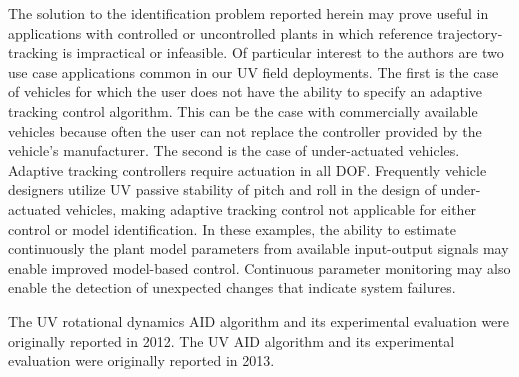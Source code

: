 The solution to the identification problem reported herein may prove
useful in applications with controlled or uncontrolled plants in which
reference trajectory-tracking is impractical or infeasible.
%
Of particular interest to the authors are two use case applications
common in our \ac{UV} field deployments.
%
The first is the case of vehicles for which the user does not have the
ability to specify an adaptive tracking control algorithm.
% 
This can be the case with commercially available vehicles because
often the user can not replace the controller provided by the
vehicle's manufacturer.
%
The second is the case of under-actuated vehicles.  
%
Adaptive tracking controllers require actuation in all \ac{DOF}.
%
Frequently vehicle designers utilize \ac{UV} passive stability of pitch
and roll in the design of under-actuated vehicles,
making adaptive tracking control not applicable for either control
or model identification.
%
In these examples, the ability to estimate continuously the plant
model parameters from available input-output signals may enable
improved model-based control.  %
%  
Continuous parameter monitoring may also enable the detection of
unexpected changes that indicate system failures.



The \ac{UV} rotational dynamics \ac{AID} algorithm and its
experimental evaluation were originally reported in
2012\cite{mcfarland2012}.
%
The \ac{UV} \ac{AID} algorithm and its experimental evaluation were
originally reported in 2013\cite{mcfarland.icra2013}.
